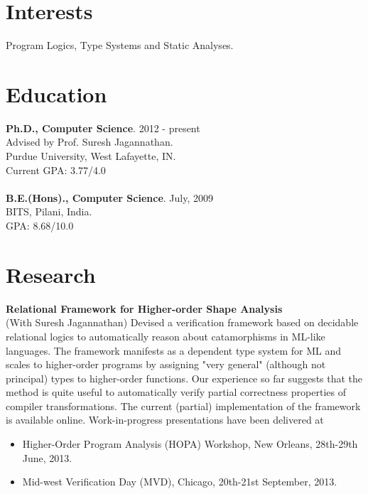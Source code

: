 \documentclass[margin,line]{res}
\begin{document}
 
 
 
\address{http://gowthamk.github.io \hspace{1.25in} gkaki@cs.purdue.edu
          \hspace{1.25in} (201) 417 1775 }

 
\begin{resume} 
 
\section{Interests} 
Program Logics, Type Systems and Static Analyses.

\section{Education} 
{\bf Ph.D., Computer Science}. \hfill 2012 - present\\
Advised by Prof. Suresh Jagannathan.\\
Purdue University, West Lafayette, IN.\\
Current GPA: 3.77/4.0 \\
\\
{\bf B.E.(Hons)., Computer Science}. \hfill July, 2009\\
BITS, Pilani, India.\\
GPA: 8.68/10.0
 

\section{Research}
 {\bf Relational Framework for Higher-order Shape Analysis} \\
 (With Suresh Jagannathan) Devised a verification framework based on
 decidable relational logics to automatically reason about
 catamorphisms in ML-like languages. The framework manifests as a
 dependent type system for ML and scales to higher-order programs by
 assigning "very general" (although not principal) types to
 higher-order functions. Our experience so far suggests that the
 method is quite useful to automatically verify partial correctness
 properties of compiler transformations. The current (partial)
 implementation of the framework is available online. Work-in-progress
 presentations have been delivered at 
 \begin{itemize} \itemsep -2pt  %
 \item Higher-Order Program Analysis (HOPA) Workshop, New Orleans,
 28th-29th June, 2013.
 \item Mid-west Verification Day (MVD), Chicago, 20th-21st September,
 2013.
 \end{itemize}


\end{resume}
\end{document}
